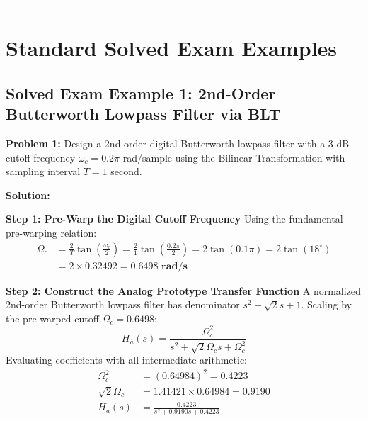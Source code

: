 \documentclass[11pt,a4paper]{article}
\begin{document}
\noindent\rule{\textwidth}{0.5pt}

\section{Standard Solved Exam Examples}

\subsection*{Solved Exam Example 1: 2nd-Order Butterworth Lowpass Filter via BLT}

\textbf{Problem 1:} Design a 2nd-order digital Butterworth lowpass filter with a 3-dB cutoff frequency $\omega_c = 0.2\pi$ rad/sample using the Bilinear Transformation with sampling interval $T = 1$ second.

\vspace{1mm}
\noindent\textbf{Solution:}

\noindent\textbf{Step 1: Pre-Warp the Digital Cutoff Frequency}
Using the fundamental pre-warping relation:
\begin{align}
\Omega_c &= \frac{2}{T} \tan\left(\frac{\omega_c}{2}\right) = \frac{2}{1} \tan\left(\frac{0.2\pi}{2}\right) = 2 \tan(0.1\pi) = 2 \tan(18^\circ) \nonumber \\
&= 2 \times 0.32492 = \mathbf{0.6498 \text{ rad/s}}
\end{align}

\noindent\textbf{Step 2: Construct the Analog Prototype Transfer Function}
A normalized 2nd-order Butterworth lowpass filter has denominator $s^2 + \sqrt{2}s + 1$. Scaling by the pre-warped cutoff $\Omega_c = 0.6498$:
\begin{equation}
H_a(s) = \frac{\Omega_c^2}{s^2 + \sqrt{2}\Omega_c s + \Omega_c^2}
\end{equation}
Evaluating coefficients with all intermediate arithmetic:
\begin{align}
\Omega_c^2 &= (0.64984)^2 = \mathbf{0.4223} \nonumber \\
\sqrt{2}\Omega_c &= 1.41421 \times 0.64984 = \mathbf{0.9190} \nonumber \\
H_a(s) &= \frac{0.4223}{s^2 + 0.9190 s + 0.4223}
\end{align}
\end{document}
